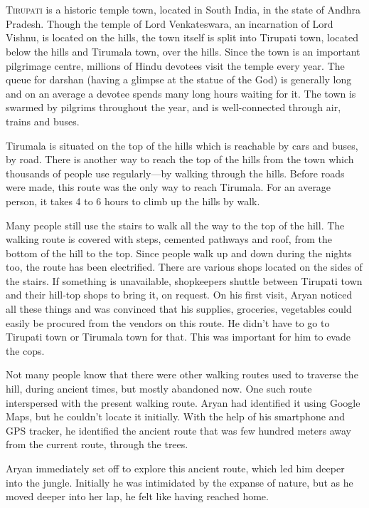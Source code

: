\chapter{}

\lettrine{T}{irupati} is a historic temple town, located in South India, in the
state of Andhra Pradesh. Though the temple of Lord Venkateswara, an incarnation
of Lord Vishnu, is located on the hills, the town itself is split into Tirupati
town, located below the hills and Tirumala town, over the hills. Since the town
is an important pilgrimage centre, millions of Hindu devotees visit the temple
every year. The queue for darshan (having a glimpse at the statue of the God) is
generally long and on an average a devotee spends many long hours waiting for
it. The town is swarmed by pilgrims throughout the year, and is well-connected
through air, trains and buses.

Tirumala is situated on the top of the hills which is reachable by cars and
buses, by road. There is another way to reach the top of the hills from the town
which thousands of people use regularly—by walking through the hills. Before
roads were made, this route was the only way to reach Tirumala. For an average
person, it takes 4 to 6 hours to climb up the hills by walk.

Many people still use the stairs to walk all the way to the top of the hill. The
walking route is covered with steps, cemented pathways and roof, from the bottom
of the hill to the top. Since people walk up and down during the nights too, the
route has been electrified. There are various shops located on the sides of the
stairs. If something is unavailable, shopkeepers shuttle between Tirupati town
and their hill-top shops to bring it, on request. On his first visit, Aryan
noticed all these things and was convinced that his supplies, groceries,
vegetables could easily be procured from the vendors on this route. He didn't
have to go to Tirupati town or Tirumala town for that. This was important for
him to evade the cops.

Not many people know that there were other walking routes used to traverse the
hill, during ancient times, but mostly abandoned now. One such route
interspersed with the present walking route. Aryan had identified it using
Google Maps, but he couldn't locate it initially. With the help of his
smartphone and GPS tracker, he identified the ancient route that was few hundred
meters away from the current route, through the trees.

Aryan immediately set off to explore this ancient route, which led him deeper
into the jungle. Initially he was intimidated by the expanse of nature, but as
he moved deeper into her lap, he felt like having reached home.

